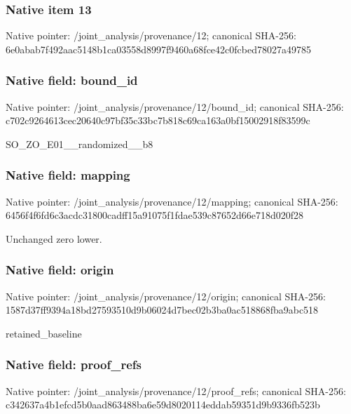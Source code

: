 \documentclass[10pt,a4paper]{article}
\begin{document}
\subsubsection{Native item 13}
Native pointer: /joint\_\allowbreak{}analysis/provenance/12; canonical SHA-256: 6e0abab7f492aac5148b1ca03558d8997f9460a68fce42c0fcbed78027a49785

\subsubsection{Native field: bound\_\allowbreak{}id}
Native pointer: /joint\_\allowbreak{}analysis/provenance/12/bound\_\allowbreak{}id; canonical SHA-256: c702c9264613cec20640c97bf35c33bc7b818c69ca163a0bf15002918f83599c

\begingroup\raggedright\sloppy SO\_\allowbreak{}ZO\_\allowbreak{}E01\_\allowbreak{}\_\allowbreak{}randomized\_\allowbreak{}\_\allowbreak{}b8\par\endgroup

\subsubsection{Native field: mapping}
Native pointer: /joint\_\allowbreak{}analysis/provenance/12/mapping; canonical SHA-256: 6456f4f6fd6c3acdc31800cadff15a91075f1fdae539c87652d66e718d020f28

\begingroup\raggedright\sloppy Unchanged zero lower.\par\endgroup

\subsubsection{Native field: origin}
Native pointer: /joint\_\allowbreak{}analysis/provenance/12/origin; canonical SHA-256: 1587d37ff9394a18bd27593510d9b06024d7bec02b3ba0ac518868fba9abc518

\begingroup\raggedright\sloppy retained\_\allowbreak{}baseline\par\endgroup

\subsubsection{Native field: proof\_\allowbreak{}refs}
Native pointer: /joint\_\allowbreak{}analysis/provenance/12/proof\_\allowbreak{}refs; canonical SHA-256: c342637a4b1efcd5b0aad863488ba6e59d8020114eddab59351d9b9336fb523b
\end{document}

